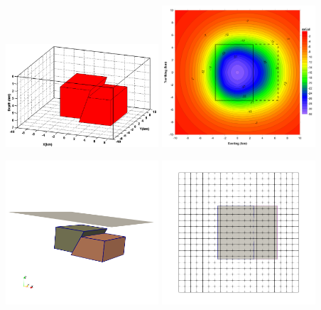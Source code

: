 \begin{center}
\includegraphics[width=5.7cm]{python_codes/fieldstone_113/images/uwms19_e}
\includegraphics[width=5.7cm]{python_codes/fieldstone_113/images/uwms19_f}
\end{center}

\begin{center}
\includegraphics[width=5.7cm]{python_codes/fieldstone_113/results/hex_test5/blocks1}
\includegraphics[width=5.7cm]{python_codes/fieldstone_113/results/hex_test5/blocks2}
\end{center}

